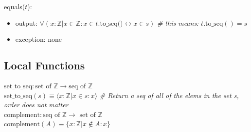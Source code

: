 \documentclass[12pt,fleqn]{examtst}
\begin{document}
\noindent equals($t$):
\begin{itemize}
\item output: $\forall ( x: \mathbb{Z} | x \in \mathbb{Z} : x \in
  t.\text{to\_seq()} \leftrightarrow x \in s)$ \textit{\# this means:} $t.\text{to\_seq}() = s$
\item exception: none
\end{itemize}

\subsection*{Local Functions}

\noindent $\mbox{set\_to\_seq}: \text{set of } \mathbb{Z} \rightarrow \mbox{seq of }
\mathbb{Z}$\\
\noindent
$\mbox{set\_to\_seq}(s) \equiv \langle x: \mathbb{Z} | x \in s : x \rangle$
\textit{\# Return a seq of all of the elems in the set s, order does not matter}\\

\noindent $\mbox{complement}: \text{seq of } \mathbb{Z} \rightarrow \mbox{ set of }
\mathbb{Z}$\\
$\mbox{complement}(A) \equiv \{ x: \mathbb{Z} | x \not\in A : x \}$\\


\newpage
\end{document}
